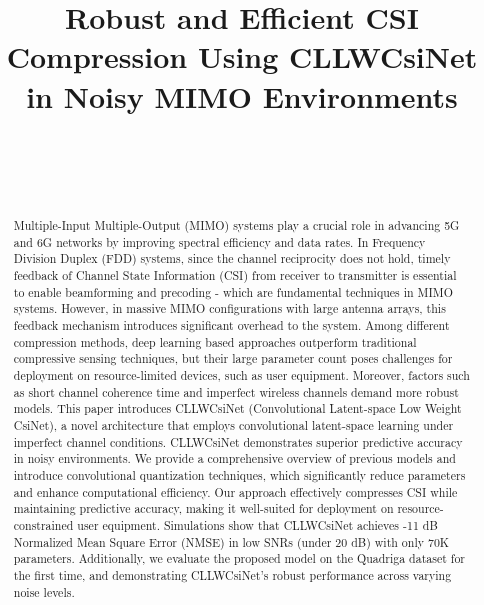 \documentclass[lettersize,journal]{IEEEtran}
\begin{document}
\title{Robust and Efficient CSI Compression Using CLLWCsiNet in Noisy MIMO Environments}

\author{
	\\
	\\
	\\
}

\maketitle
\begin{abstract}
Multiple-Input Multiple-Output (MIMO) systems play a crucial role in advancing 5G and 6G networks by improving spectral efficiency and data rates. 
In Frequency Division Duplex (FDD) systems, since the channel reciprocity does not hold, timely feedback of Channel State Information (CSI) from receiver to transmitter is essential
to enable beamforming and precoding - which are fundamental techniques in MIMO systems. 
However, in massive MIMO configurations with large antenna arrays, this feedback mechanism introduces significant overhead to the system.
Among different compression methods, deep learning based approaches outperform traditional compressive sensing techniques, but 
their large parameter count poses challenges for deployment on resource-limited devices, such as user equipment. 
Moreover, factors such as short channel coherence time and imperfect wireless channels demand more robust models.
This paper introduces CLLWCsiNet (Convolutional Latent-space Low Weight CsiNet), a novel architecture that employs convolutional latent-space learning under imperfect channel conditions. CLLWCsiNet demonstrates superior predictive accuracy in noisy environments. 
We provide a comprehensive overview of previous models and introduce convolutional quantization techniques, which significantly reduce parameters and enhance computational efficiency. Our approach effectively compresses CSI while maintaining predictive accuracy, making it well-suited for deployment on resource-constrained user equipment.
Simulations show that CLLWCsiNet achieves -11 dB Normalized Mean Square Error (NMSE) in low SNRs (under 20 dB) with only 70K parameters. 
Additionally, we evaluate the proposed model on the Quadriga dataset for the first time, and demonstrating CLLWCsiNet's robust performance across varying noise levels.

\end{abstract}
\end{document}
